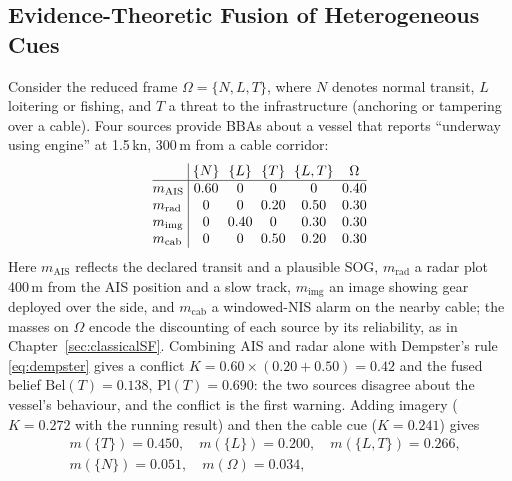 \subsection{Evidence-Theoretic Fusion of Heterogeneous Cues}
\label{subsec:maritime-evidence}
\begin{example}
\label{ex:ch07-maritime-evidence}
Consider the reduced frame $\Omega=\{N,L,T\}$, where $N$ denotes normal transit, $L$ loitering or fishing, and $T$ a threat to the infrastructure (anchoring or tampering over a cable). Four sources provide BBAs about a vessel that reports ``underway using engine'' at 1.5\,kn, 300\,m from a cable corridor:
\begin{equation}
\setlength{\arraycolsep}{3pt}
\begin{array}{@{}l|ccccc@{}}
 & \{N\} & \{L\} & \{T\} & \{L,T\} & \Omega \\
\hline
m_{\mathrm{AIS}} & 0.60 & 0 & 0 & 0 & 0.40 \\
m_{\mathrm{rad}} & 0 & 0 & 0.20 & 0.50 & 0.30 \\
m_{\mathrm{img}} & 0 & 0.40 & 0 & 0.30 & 0.30 \\
m_{\mathrm{cab}} & 0 & 0 & 0.50 & 0.20 & 0.30
\end{array}
\label{eq:ch07-maritime-bbas}
\end{equation}
Here $m_{\mathrm{AIS}}$ reflects the declared transit and a plausible SOG, $m_{\mathrm{rad}}$ a radar plot 400\,m from the AIS position and a slow track, $m_{\mathrm{img}}$ an image showing gear deployed over the side, and $m_{\mathrm{cab}}$ a windowed-NIS alarm on the nearby cable; the masses on $\Omega$ encode the discounting of each source by its reliability, as in Chapter~\ref{sec:classicalSF}. Combining AIS and radar alone with Dempster's rule \eqref{eq:dempster} gives a conflict $K=0.60\times(0.20+0.50)=0.42$ and the fused belief $\mathrm{Bel}(T)=0.138$, $\mathrm{Pl}(T)=0.690$: the two sources disagree about the vessel's behaviour, and the conflict is the first warning. Adding imagery ($K=0.272$ with the running result) and then the cable cue ($K=0.241$) gives
\begin{equation}
\begin{aligned}
&m(\{T\})=0.450,\quad m(\{L\})=0.200,\quad m(\{L,T\})=0.266,\\
&m(\{N\})=0.051,\quad m(\Omega)=0.034,
\end{aligned}
\end{equation}

\end{example}
